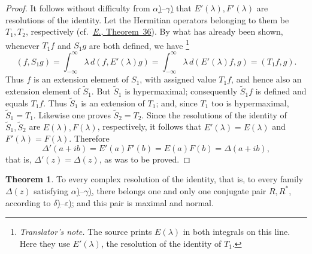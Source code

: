 \documentclass[
  paper=b5,
  twoside=true,
  fontsize=13pt,
  headings=normal,
  bookmarkpackage=false
]{scrartcl}
\theoremstyle{definition}
\newtheorem{theorem}{Theorem}
\newcommand{\ErefText}[1]{\href{https://doi.org/10.1007/BF01782338}{#1}}
\newcounter{translatornote}
\newcounter{savedfootnote}
\newcommand{\TranslatorNote}[1]{%
  \stepcounter{translatornote}%
  \setcounter{savedfootnote}{\value{footnote}}%
  \begingroup
    \renewcommand{\thefootnote}{T\arabic{translatornote}}%
    \footnote{\textit{Translator's note.} #1}%
  \endgroup
  \setcounter{footnote}{\value{savedfootnote}}}
\begin{document}
\begin{proof}
It follows without difficulty from \hyperref[thm:17:alpha]{\(\alpha\))}--\hyperref[thm:17:gamma]{\(\gamma\))} that
\(E'(\lambda),F'(\lambda)\) are resolutions of the identity.  Let the
Hermitian operators belonging to them be \(T_1,T_2\), respectively
(cf.\ \ErefText{\emph{E.}, Theorem~36}).  By what has already been shown,
whenever \(T_1f\) and \(S_1g\) are both defined, we have\TranslatorNote{The source prints
\(E(\lambda)\) in both integrals on this line. Here they use
\(E'(\lambda)\), the resolution of the identity of \(T_1\).}
\[
  (f,S_1g)
  =\int_{-\infty}^{\infty}\lambda\,d(f,E'(\lambda)g)
  =\int_{-\infty}^{\infty}\lambda\,d(E'(\lambda)f,g)
  =(T_1f,g).
\]
Thus \(f\) is an extension element of \(S_1\), with assigned value
\(T_1f\), and hence also an extension element of \(\widetilde S_1\).  But
\(\widetilde S_1\) is hypermaximal; consequently
\(\widetilde S_1f\) is defined and equals \(T_1f\).  Thus
\(\widetilde S_1\) is an extension of \(T_1\); and, since \(T_1\) too is
hypermaximal, \(\widetilde S_1=T_1\).  Likewise one proves
\(\widetilde S_2=T_2\).  Since the resolutions of the identity of
\(\widetilde S_1,\widetilde S_2\) are \(E(\lambda),F(\lambda)\),
respectively, it follows that \(E'(\lambda)=E(\lambda)\) and
\(F'(\lambda)=F(\lambda)\).  Therefore
\[
  \Delta'(a+ib)=E'(a)F'(b)=E(a)F(b)=\Delta(a+ib),
\]
that is, \(\Delta'(z)=\Delta(z)\), as was to be proved.
\end{proof}

\begin{theorem}\label{thm:19}
To every complex resolution of the identity, that is, to every family
\(\Delta(z)\) satisfying \hyperref[thm:17:alpha]{\(\alpha\))}--\hyperref[thm:17:gamma]{\(\gamma\))}, there belongs one and
only one conjugate pair \(R,R^*\), according to
\hyperref[thm:17:delta]{\(\delta\))}--\hyperref[thm:17:epsilon]{\(\varepsilon\))}; and this pair is maximal and normal.
\end{theorem}
\end{document}
